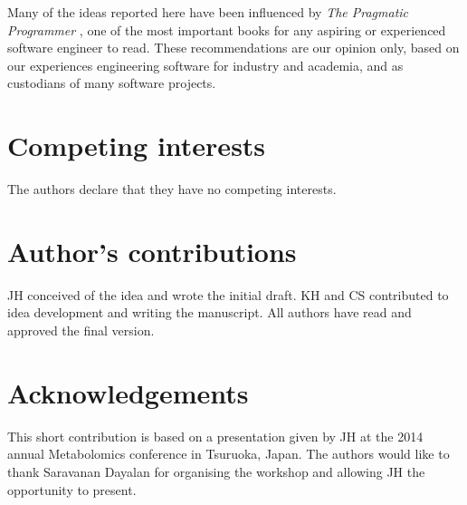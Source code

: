 \documentclass{bmcart}
\begin{document}
Many of the ideas reported here have been influenced by \textit{The Pragmatic Programmer} \cite{pragprog}, one of the most important books for any aspiring or experienced software engineer to read. These recommendations are our opinion only, based on our experiences engineering software for industry and academia, and as custodians of many software projects. 


\begin{backmatter}

\section*{Competing interests}
  The authors declare that they have no competing interests.

\section*{Author's contributions}
    JH conceived of the idea and wrote the initial draft. KH and CS contributed to idea development and writing the manuscript. All authors have read and approved the final version. 

\section*{Acknowledgements}
  This short contribution is based on a presentation given by JH at the 2014 annual Metabolomics conference in Tsuruoka, Japan. The authors would like to thank Saravanan Dayalan for organising the workshop and allowing JH the opportunity to present. 


\end{backmatter}
\end{document}
